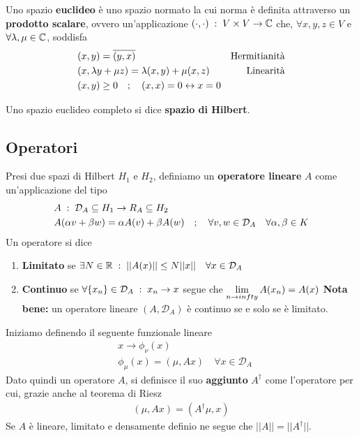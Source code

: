 Uno spazio \textbf{euclideo} è uno spazio normato la cui norma è definita attraverso un \textbf{prodotto scalare}, ovvero un'applicazione $ (\cdot , \cdot) \; : \; V \times V \rightarrow \mathbb{C} $ che, $\forall x,y,z \in V$ e $\forall \lambda, \mu \in \mathbb{C}$, soddisfa
\begin{align}
	&(x,y) = \overline{(y,x)} \quad &\text{Hermitianità}\\
	&(x, \lambda y + \mu z) = \lambda(x,y) + \mu (x,z) \quad &\text{Linearità}\\
	&(x,y) \geq 0 \quad ; \quad (x,x) = 0 \leftrightarrow x=0
\end{align}

Uno spazio euclideo completo si dice \textbf{spazio di Hilbert}.

\subsection{Operatori}

Presi due spazi di Hilbert $H_1$ e $H_2$, definiamo un \textbf{operatore lineare} $A$ come un'applicazione del tipo
\begin{align}
	&A \; : \; \mathcal{D}_A \subseteq H_1 \rightarrow R_A \subseteq H_2 \\
	&A(\alpha v + \beta w) = \alpha A(v) + \beta A(w) \quad ; \quad \forall v,w \in \mathcal{D}_A \quad \forall \alpha, \beta \in K
\end{align}
Un operatore si dice
\begin{enumerate}
	\item \textbf{Limitato} se $\exists N\in \mathbb{R} \; : \; ||A(x)|| \leq N||x|| \quad \forall x \in \mathcal{D}_A$
	\item \textbf{Continuo} se $\forall \{ x_n\} \in \mathcal{D}_A \; : \; x_n \rightarrow x$ segue che $\underset{n \rightarrow infty}{\lim} \, A(x_n) = A(x)$
		\textbf{Nota bene:} un operatore lineare $(A,\mathcal{D}_A)$ è continuo se e solo se è limitato.
\end{enumerate}

\newpage

Iniziamo definendo il seguente funzionale lineare
\begin{align}
	&x \rightarrow \phi_\nu(x)\\
	&\phi_\mu(x) = (\mu, Ax) \quad \forall x \in \mathcal{D}_A
\end{align}
Dato quindi un operatore $A$, si definisce il suo \textbf{aggiunto} $A^\dagger$ come l'operatore per cui, grazie anche al teorema di Riesz
\begin{align}
	(\mu, Ax) = (A^\dagger \mu, x)
\end{align}
Se $A$ è lineare, limitato e densamente definio ne segue che $||A|| = ||A^\dagger||$.

